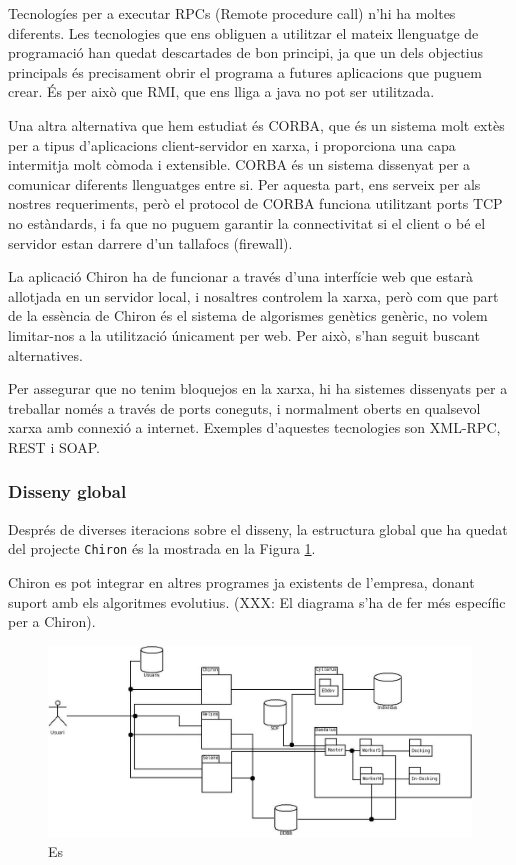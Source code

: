 Tecnologíes per a executar RPCs (Remote procedure call) n'hi ha moltes
diferents. Les tecnologies que ens obliguen a utilitzar el mateix llenguatge de
programació han quedat descartades de bon principi, ja que un dels objectius
principals és precisament obrir el programa a futures aplicacions que puguem
crear.  És per això que RMI, que ens lliga a java no pot ser utilitzada.  

Una altra alternativa que hem estudiat és CORBA, que és un sistema molt extès
per a tipus d'aplicacions client-servidor en xarxa, i proporciona una capa
intermitja molt còmoda i extensible.  CORBA és un sistema dissenyat per a
comunicar diferents llenguatges entre si.  Per aquesta part, ens serveix per als
nostres requeriments, però el protocol de CORBA funciona utilitzant ports TCP
no estàndards, i fa que no puguem garantir la connectivitat si el client o bé el
servidor estan darrere d'un tallafocs (firewall).

La aplicació Chiron ha de funcionar a través d'una interfície web que estarà
allotjada en un servidor local, i nosaltres controlem la xarxa, però com que
part de la essència de Chiron és el sistema de algorismes genètics genèric, no
volem limitar-nos a la utilització únicament per web.  Per això, s'han seguit
buscant alternatives.

Per assegurar que no tenim bloquejos en la xarxa, hi ha sistemes dissenyats per a
treballar només a través de ports coneguts, i normalment oberts en qualsevol
xarxa amb connexió a internet.  Exemples d'aquestes tecnologies son XML-RPC, REST
i SOAP.

\subsubsection{Disseny global} %
\label{ssub:Diseny global}

Després de diverses iteracions sobre el disseny, la estructura global que ha
quedat del projecte \texttt{Chiron} és la mostrada en la Figura \ref{fig:disenyChiron}.

Chiron es pot integrar en altres programes ja existents de l'empresa, donant
suport amb els algoritmes evolutius.  (XXX: El diagrama s'ha de fer més
específic per a Chiron).

\begin{figure}[h]
	\begin{center}
		\includegraphics[scale=0.4]{chiron/arquitectura_global_chiron.jpg}
	\end{center}
	\caption{Es}
	\label{fig:disenyChiron}
\end{figure}

